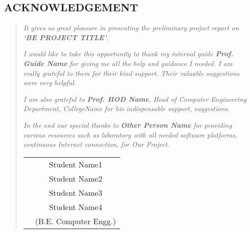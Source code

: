 \begin{center}
\pagestyle{empty}          

\begin{center}				

\begin{LARGE}
\section*{ACKNOWLEDGEMENT}
\end{LARGE}

\end{center}		


\begin{normalsize}

{\setlength{\baselineskip}{1.2\baselineskip}

\begin{quote}

\textit{It gives us great pleasure in presenting the preliminary project report 
on {\bfseries \fontsize{12}{12} \selectfont `BE PROJECT TITLE'}.}

 \textit{I would like to take this opportunity to thank my internal guide
 \textbf{Prof. Guide Name} for giving me all the help and guidance I needed. I am
 really grateful to them for their kind support. Their valuable suggestions were very helpful.} %

 \textit{I am also grateful to \textbf{Prof. HOD Name}, Head of Computer
 Engineering Department, CollegeName for his indispensable
 support, suggestions.}

\textit{In the end our special thanks to \textbf{Other Person Name} for
providing various resources such as  laboratory with all needed software platforms,
continuous Internet connection, for Our Project.}
\vspace*{3\baselineskip} \\
\begin{tabular}{p{8.2cm}c}
&Student Name1\\
&Student Name2\\
&Student Name3\\
&Student Name4\\
&(B.E. Computer Engg.)
\end{tabular}





\end{quote}
}
\end{normalsize}
\end{center}